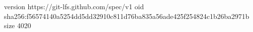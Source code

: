 version https://git-lfs.github.com/spec/v1
oid sha256:f56574140a5254dd5dd32910c811d76ba835a56ade425f254824c1b26ba2971b
size 4020
